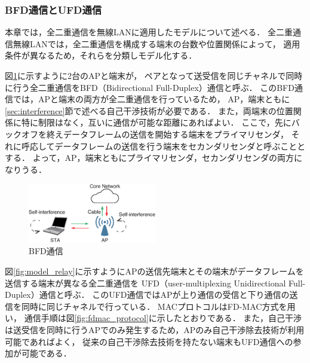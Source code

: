 \documentclass[master]{kuisthesis}		%
\begin{document}
		\subsubsection{BFD通信とUFD通信}
			本章では，全二重通信を無線LANに適用したモデルについて述べる．
			全二重通信無線LANでは，全二重通信を構成する端末の台数や位置関係によって，
			適用条件が異なるため，それらを分類しモデル化する．
			\par
			図\ref{fig:model_pair}に示すように2台のAPと端末が，
			ペアとなって送受信を同じチャネルで同時に行う全二重通信をBFD（Bidirectional Full-Duplex）通信と呼ぶ．
			このBFD通信では，APと端末の両方が全二重通信を行っているため，
			AP，端末ともに\ref{sec:interference}節で述べる自己干渉技術が必要である．
			また，両端末の位置関係に特に制限はなく，互いに通信が可能な距離にあればよい．
			ここで，先にバックオフを終えデータフレームの送信を開始する端末をプライマリセンダ，
			それに呼応してデータフレームの送信を行う端末をセカンダリセンダと呼ぶこととする．
			よって，AP，端末ともにプライマリセンダ，セカンダリセンダの両方になりうる．

			\begin{figure}[t]
				\begin{center}
					\includegraphics[width=0.5\textwidth]{fig/bfd.eps}
					\caption{BFD通信}
					\label{fig:model_pair}
				\end{center}
			\end{figure}


			\par
			図\ref{fig:model_relay}に示すようにAPの送信先端末とその端末がデータフレームを送信する端末が異なる全二重通信を
			UFD（user-multiplexing Unidirectional Full-Duplex）通信と呼ぶ．
			このUFD通信ではAPが上り通信の受信と下り通信の送信を同時に同じチャネルで行っている．
			MACプロトコルはFD-MAC方式を用い，
			通信手順は図\ref{fig:fdmac_protocol}に示したとおりである．
			また，自己干渉は送受信を同時に行うAPでのみ発生するため，APのみ自己干渉除去技術が利用可能であればよく，
			従来の自己干渉除去技術を持たない端末もUFD通信への参加が可能である．
\end{document}
